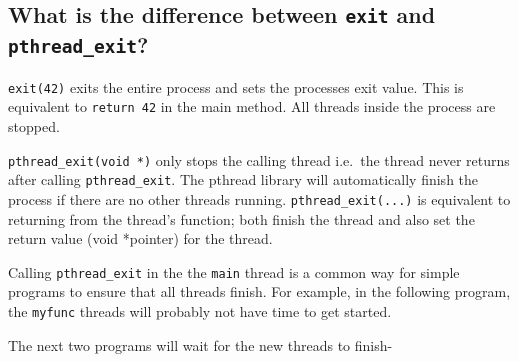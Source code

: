\subsection{\texorpdfstring{What is the difference between \texttt{exit}
and
\texttt{pthread\_exit}?}{What is the difference between exit and pthread\_exit?}}\label{what-is-the-difference-between-exit-and-pthreadux5fexit}

\texttt{exit(42)} exits the entire process and sets the processes exit
value. This is equivalent to \texttt{return\ 42} in the main method. All
threads inside the process are stopped.

\texttt{pthread\_exit(void\ *)} only stops the calling thread i.e.~the
thread never returns after calling \texttt{pthread\_exit}. The pthread
library will automatically finish the process if there are no other
threads running. \texttt{pthread\_exit(...)} is equivalent to returning
from the thread's function; both finish the thread and also set the
return value (void *pointer) for the thread.

Calling \texttt{pthread\_exit} in the the \texttt{main} thread is a
common way for simple programs to ensure that all threads finish. For
example, in the following program, the \texttt{myfunc} threads will
probably not have time to get started.

\begin{Shaded}
\begin{Highlighting}[]
 
  \NormalTok{);}
  \NormalTok{);}
  \NormalTok{); }

\NormalTok{\}}
\end{Highlighting}
\end{Shaded}

The next two programs will wait for the new threads to finish-

\begin{Shaded}
\begin{Highlighting}[]
 
  \NormalTok{);}
  \NormalTok{);}

\NormalTok{\}}
\end{Highlighting}
\end{Shaded}

